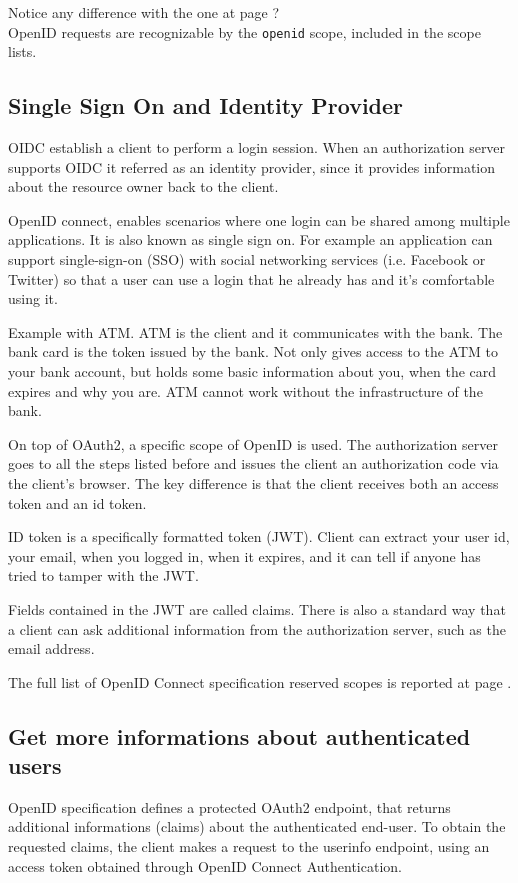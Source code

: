 Notice any difference with the one at page \pageref{lst:authorization-code}?
\\
OpenID requests are recognizable by the \texttt{openid} scope, included in the
scope lists.

\subsection{Single Sign On and Identity Provider}
OIDC establish a client to perform a login session.
When an authorization server supports OIDC it referred as an identity provider,
since it provides information about the resource owner back to the client.

OpenID connect, enables scenarios where one login can be shared among multiple
applications. It is also known as single sign on.
For example an application can support single-sign-on (SSO) with social networking services (i.e.
Facebook or Twitter) so that a user can use a login that he already has and it's
comfortable using it.

Example with ATM. ATM is the client and it communicates with the bank. The bank
card is the token issued by the bank. Not only gives access to the ATM to your
bank account, but holds some basic information about you, when the card expires
and why you are.
ATM cannot work without the infrastructure of the bank.

On top of OAuth2, a specific scope of OpenID is used. The authorization server
goes to all the steps listed before and issues the client an authorization code
via the client's browser.
The key difference is that the client receives both an access token and an id
token.

ID token is a specifically formatted token (JWT). Client can extract your user
id, your email, when you logged in, when it expires, and it can tell if anyone
has tried to tamper with the JWT.

Fields contained in the JWT are called claims.
There is also a standard way that a client can ask additional information from the
authorization server, such as the email address.

The full list of OpenID Connect specification reserved scopes is reported at
page \pageref{openid}.

\subsection{Get more informations about authenticated users}
OpenID specification defines a protected OAuth2 endpoint, that returns
additional informations (claims) about the authenticated end-user.
To obtain the requested claims, the client makes a request to the userinfo
endpoint, using an access token obtained through OpenID Connect
Authentication.

